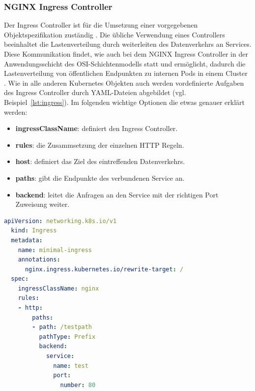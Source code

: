 \subsubsection{NGINX Ingress Controller}
Der Ingress Controller ist für die Umsetzung einer vorgegebenen Objektspezifikation zuständig \cite{kubernetesingress}.
Die übliche Verwendung eines Controllers beeinhaltet die Lastenverteilung durch weiterleiten des Datenverkehrs an Services. 
Diese Kommunikation findet, wie auch bei dem NGINX Ingress Controller \cite{kubernetesingresscontrollerlayer} in der Anwendungsschicht des OSI-Schichtenmodells statt und ermöglicht, dadurch die 
Lastenverteilung von öffentlichen Endpunkten zu internen Pods in einem Cluster \cite{kubernetesingressibm}.
Wie in alle anderen Kubernetes Objekten auch werden vordefinierte Aufgaben des Ingress Controller durch YAML-Dateien abgebildet (vgl. Beispiel~\ref{lst:ingress}).
Im folgenden wichtige Optionen die etwas genauer erklärt werden:

\begin{itemize}
  \item \textbf{ingressClassName}: definiert den Ingress Controller.
  \item \textbf{rules}: die Zusammsetzung der einzelnen HTTP Regeln.
  \item \textbf{host}: definiert das Ziel des eintreffenden Datenverkehrs.
  \item \textbf{paths}: gibt die Endpunkte des verbundenen Service an.
  \item \textbf{backend}: leitet die Anfragen an den Service mit der richtigen Port Zuweisung weiter.
\end{itemize}

\begin{lstlisting}[caption={ingress.yaml \cite{kubernetesingress} },captionpos=b,label={lst:ingress},language=yaml]
  apiVersion: networking.k8s.io/v1
  kind: Ingress
  metadata:
    name: minimal-ingress
    annotations:
      nginx.ingress.kubernetes.io/rewrite-target: /
  spec:
    ingressClassName: nginx
    rules:
    - http:
        paths:
        - path: /testpath
          pathType: Prefix
          backend:
            service:
              name: test
              port:
                number: 80
  \end{lstlisting}


